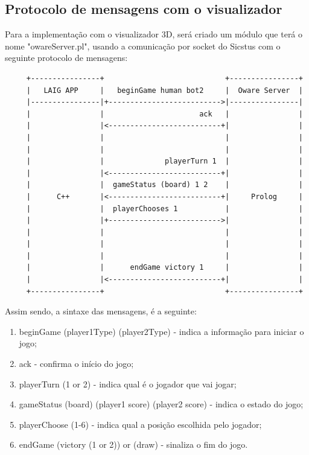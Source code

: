 \documentclass[15pt,a4paper]{article}
\begin{document}
\subsection{Protocolo de mensagens com o visualizador}
Para a implementação com o visualizador 3D, será criado um módulo que terá o nome "owareServer.pl", usando a comunicação por socket do Sicstus com o seguinte protocolo de mensagens:
\begin{verbatim}
     +----------------+                            +----------------+
     |   LAIG APP     |   beginGame human bot2     |  Oware Server  |
     |----------------|+-------------------------->|----------------|
     |                |                      ack   |                |
     |                |<--------------------------+|                |
     |                |                            |                |
     |                |                            |                |
     |                |              playerTurn 1  |                |
     |                |<--------------------------+|                |
     |                |  gameStatus (board) 1 2    |                |
     |      C++       |<--------------------------+|     Prolog     |
     |                |  playerChooses 1           |                |
     |                |+-------------------------->|                |
     |                |                            |                |
     |                |                            |                |
     |                |                            |                |
     |                |      endGame victory 1     |                |
     |                |<--------------------------+|                |
     +----------------+                            +----------------+
\end{verbatim}
Assim sendo, a sintaxe das mensagens, é a seguinte:
\begin{enumerate}
\item beginGame (player1Type) (player2Type) - indica a informação para iniciar o jogo;
\item ack - confirma o início do jogo;
\item playerTurn (1 or 2) - indica qual é o jogador que vai jogar;
\item gameStatus (board) (player1 score) (player2 score) - indica o estado do jogo;
\item playerChoose (1-6) - indica qual a posição escolhida pelo jogador;
\item endGame (victory (1 or 2)) or (draw) - sinaliza o fim do jogo.
\end{enumerate}
\end{document}
